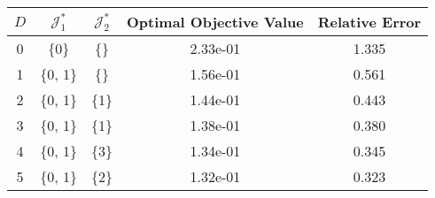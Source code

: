 \begin{subtable}{\textwidth}
\centering
\begin{tabular}{|c|c|c|c|c|}
  \hline
$D$ & $\mathcal J_1^*$ & $\mathcal J_2^*$ & Optimal Objective Value & Relative Error \\ 
  \hline
0 & \{0\} & \{\} & 2.33e-01 & 1.335 \\ 
  1 & \{0, 1\} & \{\} & 1.56e-01 & 0.561 \\ 
  2 & \{0, 1\} & \{1\} & 1.44e-01 & 0.443 \\ 
  3 & \{0, 1\} & \{1\} & 1.38e-01 & 0.380 \\ 
  4 & \{0, 1\} & \{3\} & 1.34e-01 & 0.345 \\ 
  5 & \{0, 1\} & \{2\} & 1.32e-01 & 0.323 \\ 
   \hline
\end{tabular}
\end{subtable}
